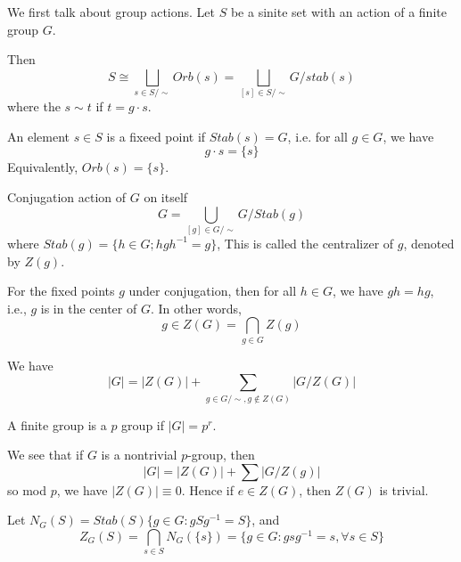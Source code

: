We first talk about group actions. Let $S$ be a sinite set with an action of a finite group $G$.
\begin{thm}
    Then 
    \begin{equation*}
        S\cong\bigsqcup_{s\in S/\sim}Orb(s)=\bigsqcup_{[s]\in S/\sim}G/stab(s)
    \end{equation*}
    where the $s\sim t$ if $t=g\cdot s$.
\end{thm}
\begin{defn}
    An element $s\in S$ is a fixeed point if $Stab(s)=G$, i.e. for all $g\in G$, we have 
    \begin{equation*}
        g\cdot s=\{s\}
    \end{equation*}
    Equivalently, $Orb(s)=\{s\}$.
\end{defn}
\begin{example}
    Conjugation action of $G$ on itself 
    \begin{equation*}
        G=\bigcup_{[g]\in G/\sim}G/Stab(g)
    \end{equation*}
    where $Stab(g)=\{h\in G; hgh^{-1}=g\}$, This is called the centralizer of $g$, denoted by $Z(g)$.

    For the fixed points $g$ under conjugation, then for all $h\in G$, we have $gh=hg$, i.e., $g$ is in the center of $G$. In other words, 
    \begin{equation*}
        g\in Z(G)=\bigcap_{g\in G}Z(g)
    \end{equation*}
\end{example}
\begin{cor}
    We have 
    \begin{equation*}
        |G|=|Z(G)|+\sum_{g\in G/\sim, g\not\in Z(G)}|G/Z(G)|
    \end{equation*}
\end{cor}
\begin{defn}
    A finite group is a $p$ group if $|G|=p^r$. 
\end{defn}
We see that if $G$ is a nontrivial $p$-group, then 
\begin{equation*}
    |G|=|Z(G)|+\sum|G/Z(g)|
\end{equation*}
so mod $p$, we have $|Z(G)|\equiv 0$. Hence if $e\in Z(G)$, then $Z(G)$ is trivial.
\begin{defn}[normalizer]
    Let $N_G(S)=Stab(S)\{g\in G: gSg^{-1}=S\}$, and 
    \begin{equation*}
        Z_G(S)=\bigcap_{s\in S}N_G(\{s\})=\{g\in G: gsg^{-1}=s, \forall s\in S\}
    \end{equation*}
\end{defn}
